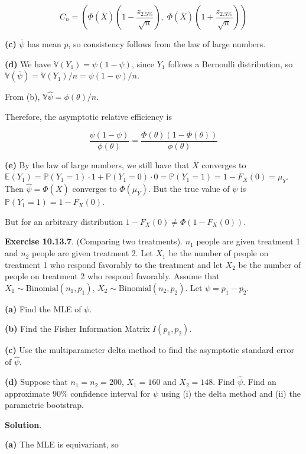 \[ C_n = \left(\Phi(\overline{X}) \left(1 - \frac{z_{2.5\%}}{\sqrt{n}}\right), \; 
\Phi(\overline{X}) \left(1 + \frac{z_{2.5\%}}{\sqrt{n}}\right) \right)\]

\textbf{(c)} \(\overline{\psi}\) has mean \(p\), so consistency follows
from the law of large numbers.

\textbf{(d)} We have \(\mathbb{V}(Y_1) = \psi (1 - \psi)\), since
\(Y_1\) follows a Bernoulli distribution, so
\(\mathbb{V}(\overline{\psi}) = \mathbb{V}(Y_1) / n = \psi (1 - \psi) / n\).

From (b), \(\mathbb{V}{\hat{\psi}} = \phi(\theta) / n\).

Therefore, the asymptotic relative efficiency is

\[\frac{\psi(1 - \psi)}{\phi(\theta)} = \frac{\Phi(\theta)(1 - \Phi(\theta))}{\phi(\theta)}\]

\textbf{(e)} By the law of large numbers, we still have that
\(\overline{X}\) converges to
\(\mathbb{E}(Y_1) = \mathbb{P}(Y_1 = 1) \cdot 1 + \mathbb{P}(Y_1 = 0)\cdot 0 = \mathbb{P}(Y_1 = 1) = 1 - F_X(0) = \mu_Y\).
Then \(\hat{\psi} = \Phi(\overline{X})\) converges to \(\Phi(\mu_Y)\).
But the true value of \(\psi\) is \(\mathbb{P}(Y_1 = 1) = 1 - F_X(0)\).

But for an arbitrary distribution \(1 - F_X(0) \neq \Phi(1 - F_X(0))\).

\textbf{Exercise 10.13.7}. (Comparing two treatments). \(n_1\) people
are given treatment 1 and \(n_2\) people are given treatment 2. Let
\(X_1\) be the number of people on treatment 1 who respond favorably to
the treatment and let \(X_2\) be the number of people on treatment 2 who
respond favorably. Assume that \(X_1 \sim \text{Binomial}(n_1, p_1)\),
\(X_2 \sim \text{Binomial}(n_2, p_2)\). Let \(\psi = p_1 - p_2\).

\textbf{(a)} Find the MLE of \(\psi\).

\textbf{(b)} Find the Fisher Information Matrix \(I(p_1, p_2)\).

\textbf{(c)} Use the multiparameter delta method to find the asymptotic
standard error of \(\hat{\psi}\).

\textbf{(d)} Suppose that \(n_1 = n_2 = 200\), \(X_1 = 160\) and
\(X_2 = 148\). Find \(\hat{\psi}\). Find an approximate 90\% confidence
interval for \(\psi\) using (i) the delta method and (ii) the parametric
bootstrap.

\textbf{Solution}.

\textbf{(a)} The MLE is equivariant, so

